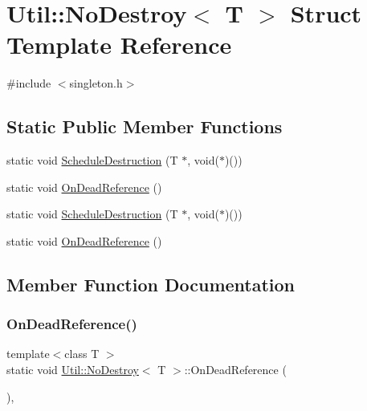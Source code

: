 \hypertarget{structUtil_1_1NoDestroy}{}\section{Util\+:\+:No\+Destroy$<$ T $>$ Struct Template Reference}
\label{structUtil_1_1NoDestroy}


{\ttfamily \#include $<$singleton.\+h$>$}

\subsection*{Static Public Member Functions}
\begin{DoxyCompactItemize}
\item 
static void \mbox{\hyperlink{structUtil_1_1NoDestroy_ae6d5e0f02676f06596f1280f22c9393d}{Schedule\+Destruction}} (T $\ast$, void($\ast$)())
\item 
static void \mbox{\hyperlink{structUtil_1_1NoDestroy_a558d463fad4c69bdc42ce55d7f5ebff5}{On\+Dead\+Reference}} ()
\item 
static void \mbox{\hyperlink{structUtil_1_1NoDestroy_ae6d5e0f02676f06596f1280f22c9393d}{Schedule\+Destruction}} (T $\ast$, void($\ast$)())
\item 
static void \mbox{\hyperlink{structUtil_1_1NoDestroy_a558d463fad4c69bdc42ce55d7f5ebff5}{On\+Dead\+Reference}} ()
\end{DoxyCompactItemize}


\subsection{Member Function Documentation}
\mbox{\label{structUtil_1_1NoDestroy_a558d463fad4c69bdc42ce55d7f5ebff5}} 
\subsubsection{\texorpdfstring{OnDeadReference()}{OnDeadReference()}\hspace{0.1cm}{\footnotesize\ttfamily [1/2]}}
{\footnotesize\ttfamily template$<$class T $>$ \\
static void \mbox{\hyperlink{structUtil_1_1NoDestroy}{Util\+::\+No\+Destroy}}$<$ T $>$\+::On\+Dead\+Reference (\begin{DoxyParamCaption}{ }\end{DoxyParamCaption})\hspace{0.3cm}{\ttfamily [inline]}, {\ttfamily [static]}}

